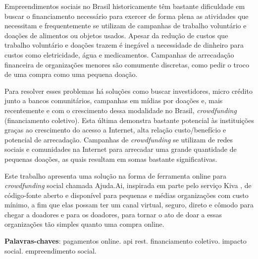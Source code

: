 \begin{resumo}
Empreendimentos sociais no Brasil historicamente têm bastante dificuldade em buscar o financiamento necessário para exercer de forma plena as atividades que necessitam e frequentemente se utilizam de campanhas de trabalho voluntário e doações de alimentos ou objetos usados. Apesar da redução de custos que trabalho voluntário e doações trazem é inegável a necessidade de dinheiro para custos como eletricidade, água e medicamentos. Campanhas de arrecadação financeira de organizações menores são comumente discretas, como pedir o troco de uma compra como uma pequena doação.

Para resolver esses problemas há soluções como buscar investidores, micro crédito junto a bancos comunitários, campanhas em mídias por doações e, mais recentemente e com o crescimento dessa modalidade no Brasil, \emph{crowdfunding} (financiamento coletivo). Esta última demonstra bastante potencial às instituições graças ao crescimento do acesso a Internet, alta relação custo/benefício e potencial de arrecadação. Campanhas de \emph{crowdfunding} se utilizam de redes sociais e comunidades na Internet para arrecadar uma grande quantidade de pequenas doações, as quais resultam em somas bastante significativas.

Este trabalho apresenta uma solução na forma de ferramenta online para \emph{crowdfunding} social chamada Ajuda.Ai, inspirada em parte pelo serviço Kiva \cite{flannery2007kiva}, de código-fonte aberto e disponível para pequenas e médias organizações com custo mínimo, a fim que elas possam ter um canal virtual, seguro, direto e cômodo para chegar a doadores e para os doadores, para tornar o ato de doar a essas organizações tão simples quanto uma compra online.

\vspace{\onelineskip}
\noindent
\textbf{Palavras-chaves}: pagamentos online. api rest. financiamento coletivo. impacto social. empreendimento social.
\end{resumo}